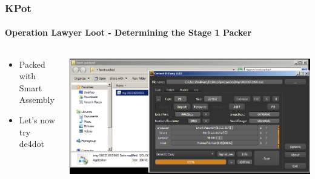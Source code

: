 \documentclass[aspectratio=169]{beamer}
\begin{document}
{
\begin{frame}
  \frametitle{KPot}
  \framesubtitle{Operation Lawyer Loot - Determining the Stage 1 Packer}
  \begin{columns}
    \begin{column}{.3\textwidth}
      \begin{itemize}
      \item{Packed with Smart Assembly}
      \item{Let's now try de4dot}
      \end{itemize}
    \end{column}
    \hfill
    \begin{column}{.7\textwidth}
      \begin{center}
        \includegraphics[scale=1.25]{kpot-unpacking-2}
      \end{center}
    \end{column}
  \end{columns}
\end{frame}
}
\end{document}
